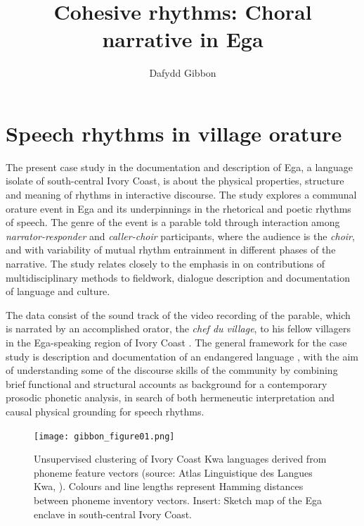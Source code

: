 \documentclass[output=paper,colorlinks,citecolor=brown]{langscibook}
\author{Dafydd Gibbon\orcid{0000—0002—9825—5516}\affiliation{Bielefeld University}}
\title{Cohesive rhythms: Choral narrative in Ega}
\begin{document}
\maketitle


\section{Speech rhythms in village orature}

The present case study in the documentation and description of Ega, a language isolate of south-central Ivory Coast, is about the physical properties, structure and meaning of rhythms in interactive discourse. The study explores a communal orature event in Ega and its underpinnings in the rhetorical and poetic rhythms of speech. The genre of the event is a parable told through interaction among \textit{narrator-responder} and \textit{caller-choir} participants, where the audience is the \textit{choir}, and with variability of mutual rhythm entrainment in different phases of the narrative. The study relates closely to the emphasis in  on contributions of multidisciplinary methods to fieldwork, dialogue description and documentation of language and culture.

The data consist of the sound track of the video recording of the parable, which is narrated by an accomplished orator, the \textit{chef du village}, to his fellow villagers in the Ega-speaking region of Ivory Coast \citep{rossinigibbon2011}. The general framework for the case study is description and documentation of an endangered language \citep{gibbonbowbirdhughes2004}, with the aim of understanding some of the discourse skills of the community by combining brief functional and structural accounts as background for a contemporary prosodic phonetic analysis, in search of both hermeneutic interpretation and causal physical grounding for speech rhythms.

\begin{figure}
\texttt{[image: gibbon\_figure01.png]}
\caption{\label{fig:fig01}Unsupervised clustering of Ivory Coast Kwa languages derived from phoneme feature vectors (source: Atlas Linguistique des Langues Kwa, \citealt{herault1983}). Colours and line lengths represent Hamming distances between phoneme inventory vectors. Insert: Sketch map of the Ega enclave in south-central Ivory Coast.}
\end{figure}
\end{document}

